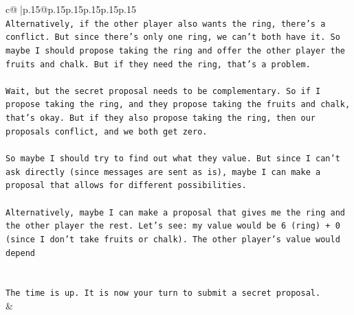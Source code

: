 \documentclass{article}
\begin{document}
{\begin{supertabular}{c@{$\;$}|p{.15\linewidth}@{}p{.15\linewidth}p{.15\linewidth}p{.15\linewidth}p{.15\linewidth}p{.15\linewidth}}
{{{\\ 
\texttt{Alternatively, if the other player also wants the ring, there's a conflict. But since there's only one ring, we can't both have it. So maybe I should propose taking the ring and offer the other player the fruits and chalk. But if they need the ring, that's a problem.} \\
\\ 
\texttt{Wait, but the secret proposal needs to be complementary. So if I propose taking the ring, and they propose taking the fruits and chalk, that's okay. But if they also propose taking the ring, then our proposals conflict, and we both get zero.} \\
\\ 
\texttt{So maybe I should try to find out what they value. But since I can't ask directly (since messages are sent as is), maybe I can make a proposal that allows for different possibilities.} \\
\\ 
\texttt{Alternatively, maybe I can make a proposal that gives me the ring and the other player the rest. Let's see: my value would be 6 (ring) + 0 (since I don't take fruits or chalk). The other player's value would depend} \\
\\ 
\\ 
\texttt{The time is up. It is now your turn to submit a secret proposal.} \\
            }
        }
    }
    & \\ \\


\end{supertabular}}
\end{document}
